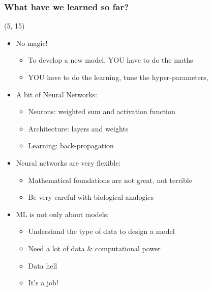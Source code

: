 \begin{frame}
  \frametitle{What have we learned so far?}

  \begin{textblock}{90}(5, 15)
    \begin{itemize}
    \item<1-> No magic!
      \begin{itemize}
      \item To develop a new model, YOU have to do the maths
      \item YOU have to do the learning, tune the hyper-parameters, \etc{}
      \end{itemize}
    \item<2-> A bit of Neural Networks:
      \begin{itemize}
      \item Neurons: weighted sum and activation function
      \item Architecture: layers and weights
      \item Learning: back-propagation
      \end{itemize}
    \item<3-> Neural networks are very flexible:
      \begin{itemize}
      \item Mathematical foundations are not great, not terrible
      \item Be very careful with biological analogies
      \end{itemize}
    \item<4-> \ac{ML} is not only about models:
      \begin{itemize}
      \item Understand the type of data to design a model
      \item Need a lot of data \& computational power
      \item Data hell
      \item It's a job!
      \end{itemize}
    \end{itemize}
  \end{textblock}
\end{frame}
